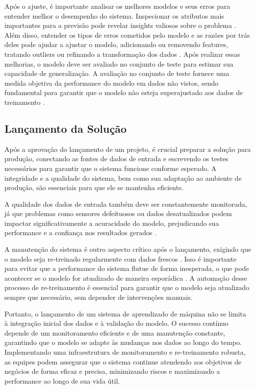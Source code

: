 Após o ajuste, é importante analisar os melhores modelos e seus erros para entender melhor o desempenho do sistema. Inspecionar os atributos mais importantes para a previsão pode revelar insights valiosos sobre o problema \cite{muller2017}. Além disso, entender os tipos de erros cometidos pelo modelo e as razões por trás deles pode ajudar a ajustar o modelo, adicionando ou removendo features, tratando outliers ou refinando a transformação dos dados \cite{muller2017}. Após realizar essas melhorias, o modelo deve ser avaliado no conjunto de teste para estimar sua capacidade de generalização. A avaliação no conjunto de teste fornece uma medida objetiva da performance do modelo em dados não vistos, sendo fundamental para garantir que o modelo não esteja superajustado aos dados de treinamento \cite{muller2017}.

\subsection{Lançamento da Solução}
Após a aprovação do lançamento de um projeto, é crucial preparar a solução para produção, conectando as fontes de dados de entrada e escrevendo os testes necessários para garantir que o sistema funcione conforme esperado. A integridade e a qualidade do sistema, bem como sua adaptação ao ambiente de produção, são essenciais para que ele se mantenha eficiente.

A qualidade dos dados de entrada também deve ser constantemente monitorada, já que problemas como sensores defeituosos ou dados desatualizados podem impactar significativamente a acuracidade do modelo, prejudicando sua performance e a confiança nos resultados gerados  \cite{muller2017}.

A manutenção do sistema é outro aspecto crítico após o lançamento, exigindo que o modelo seja re-treinado regularmente com dados frescos \cite{geron2017}. Isso é importante para evitar que a performance do sistema flutue de forma inesperada, o que pode acontecer se o modelo for atualizado de maneira esporádica \cite{geron2017}. A automação desse processo de re-treinamento é essencial para garantir que o modelo seja atualizado sempre que necessário, sem depender de intervenções manuais. 

Portanto, o lançamento de um sistema de aprendizado de máquina não se limita à integração inicial dos dados e à validação do modelo. O sucesso contínuo depende de um monitoramento eficiente e de uma manutenção constante, garantindo que o modelo se adapte às mudanças nos dados ao longo do tempo. Implementando uma infraestrutura de monitoramento e re-treinamento robusta, as equipes podem assegurar que o sistema continue atendendo aos objetivos de negócios de forma eficaz e precisa, minimizando riscos e maximizando a performance ao longo de sua vida útil.


